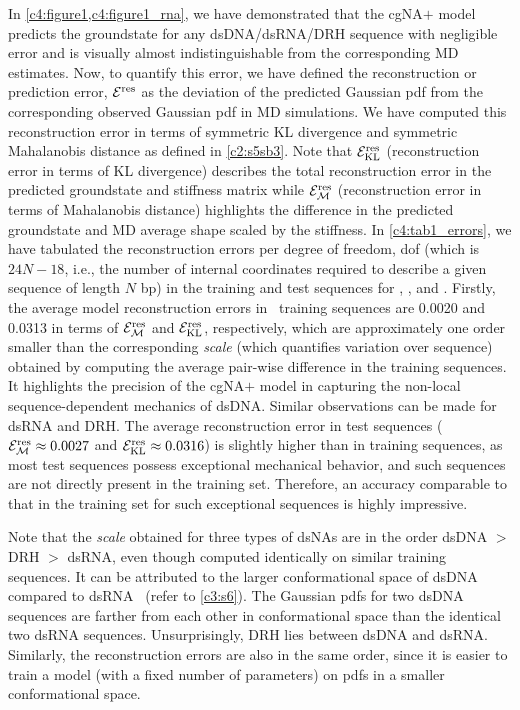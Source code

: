 In \cref{c4:figure1,c4:figure1_rna}, we have demonstrated that the cgNA$+$ model predicts the groundstate for any dsDNA/dsRNA/DRH sequence with negligible error and is visually almost indistinguishable from the corresponding MD estimates.
Now, to quantify this error, we have defined the reconstruction or prediction error, ${\mathcal E}^{\text{res}}$ as the deviation of the predicted Gaussian pdf from the corresponding observed Gaussian pdf in MD simulations.
We have computed this reconstruction error in terms of symmetric KL divergence and symmetric Mahalanobis distance as defined in \cref{c2:s5sb3}. 
Note that ${\mathcal E}_{\text{KL}}^{\text{res}}$ (reconstruction error in terms of KL divergence) describes the total reconstruction error in the predicted groundstate and stiffness matrix while ${\mathcal E}_{\mathcal{M}}^{\text{res}}$ (reconstruction error in terms of Mahalanobis distance) highlights the difference in the predicted groundstate and MD average shape scaled by the stiffness.
In \cref{c4:tab1_errors}, we have tabulated the reconstruction errors per degree of freedom, dof (which is $24N-18$, i.e., the number of internal coordinates required to describe a given sequence of length $N$ bp) in the training and test sequences for \Lbdna, \Lbrna, and \Lbdrh. 
Firstly, the average model reconstruction errors in \Lbdna \ training sequences are 0.0020 and 0.0313 in terms of ${\mathcal E}_{\mathcal{M}}^{\text{res}}$ and ${\mathcal E}_{\text{KL}}^{\text{res}}$, respectively, which are approximately one order smaller than the corresponding \textit{scale} (which quantifies variation over sequence) obtained by computing the average pair-wise difference in the training sequences.
It highlights the precision of the cgNA$+$ model in capturing the non-local sequence-dependent mechanics of dsDNA. 
Similar observations can be made for dsRNA and DRH.
The average reconstruction error in test sequences (${\mathcal E}_{\mathcal{M}}^{\text{res}} \approx 0.0027$ and ${\mathcal E}_{\text{KL}}^{\text{res}} \approx 0.0316$) is slightly higher than in training sequences, as most test sequences possess exceptional mechanical behavior, and such sequences are not directly present in the training set.
Therefore, an accuracy comparable to that in the training set for such exceptional sequences is highly impressive.

Note that the \textit{scale} obtained for three types of dsNAs are in the order dsDNA $>$ DRH $>$ dsRNA, even though computed identically on similar training sequences.
It can be attributed to the larger conformational space of dsDNA compared to dsRNA~\cite{noy2004relative,noy2005structure} (refer to \cref{c3:s6}).
The Gaussian pdfs for two dsDNA sequences are farther from each other in conformational space than the identical two dsRNA sequences.
Unsurprisingly, DRH lies between dsDNA and dsRNA.
Similarly, the reconstruction errors are also in the same order, since it is easier to train a model (with a fixed number of parameters) on pdfs in a smaller conformational space.

